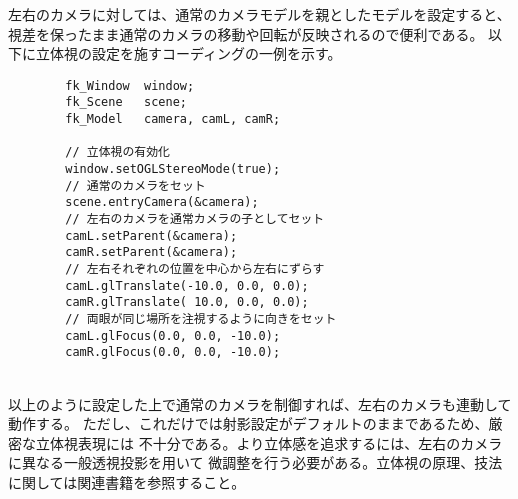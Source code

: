 左右のカメラに対しては、通常のカメラモデルを親としたモデルを設定すると、
視差を保ったまま通常のカメラの移動や回転が反映されるので便利である。
以下に立体視の設定を施すコーディングの一例を示す。
\\
\begin{breakbox}
\begin{verbatim}
        fk_Window  window;
        fk_Scene   scene;
        fk_Model   camera, camL, camR;

        // 立体視の有効化
        window.setOGLStereoMode(true);
        // 通常のカメラをセット
        scene.entryCamera(&camera);
        // 左右のカメラを通常カメラの子としてセット
        camL.setParent(&camera);
        camR.setParent(&camera);
        // 左右それぞれの位置を中心から左右にずらす
        camL.glTranslate(-10.0, 0.0, 0.0);
        camR.glTranslate( 10.0, 0.0, 0.0);
        // 両眼が同じ場所を注視するように向きをセット
        camL.glFocus(0.0, 0.0, -10.0);
        camR.glFocus(0.0, 0.0, -10.0);
\end{verbatim}
\end{breakbox}
~ \\
以上のように設定した上で通常のカメラを制御すれば、左右のカメラも連動して動作する。
ただし、これだけでは射影設定がデフォルトのままであるため、厳密な立体視表現には
不十分である。より立体感を追求するには、左右のカメラに異なる一般透視投影を用いて
微調整を行う必要がある。立体視の原理、技法に関しては関連書籍を参照すること。
